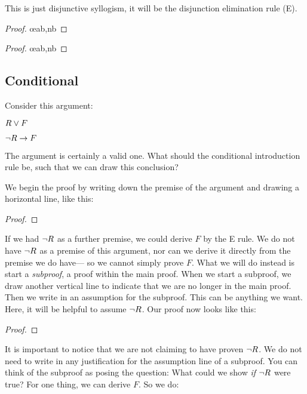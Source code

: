 This is just disjunctive syllogism, it will be the disjunction elimination rule ({\eor}E).
\begin{multicols}{2}
\begin{proof}
	 \oe{ab,nb}
\end{proof}

\begin{proof}
	 \oe{ab,nb}
\end{proof}

\end{multicols}

\subsection{Conditional}

Consider this argument:
\begin{earg}
\item[] $R \vee F$
\item[\therefore] $\neg R \rightarrow F$
\end{earg}
The argument is certainly a valid one. What should the conditional introduction rule be, such that we can draw this conclusion?

We begin the proof by writing down the premise of the argument and drawing a horizontal line, like this:

\begin{proof}
\end{proof}

If we had $\neg R$ as a further premise, we could derive $F$ by the {\eor}E rule. We do not have $\neg R$ as a premise of this argument, nor can we derive it directly from the premise we do have--- so we cannot simply prove $F$. What we will do instead is start a \emph{subproof}, a proof within the main proof. When we start a subproof, we draw another vertical line to indicate that we are no longer in the main proof. Then we write in an assumption for the subproof. This can be anything we want. Here, it will be helpful to assume $\neg R$. Our proof now looks like this:

\begin{proof}
	\open
	\close
\end{proof}

It is important to notice that we are not claiming to have proven $\neg R$. We do not need to write in any justification for the assumption line of a subproof. You can think of the subproof as posing the question: What could we show \emph{if} $\neg R$ were true? For one thing, we can derive $F$. So we do:

